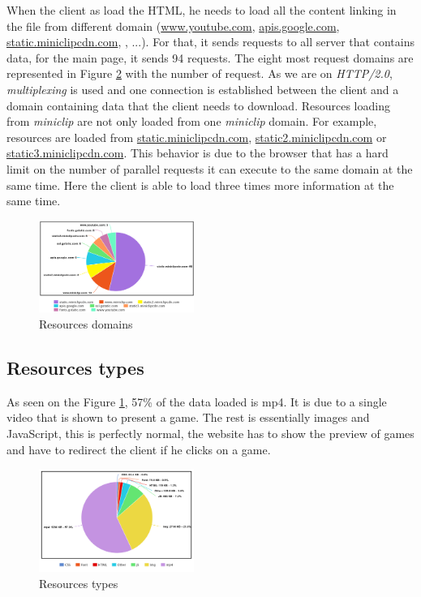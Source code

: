 \documentclass{article}
\begin{document}
When the client as load the HTML, he needs to load all the content linking in the file from different domain (\url{www.youtube.com}, \url{apis.google.com}, \url{static.miniclipcdn.com}, , ...). For that, it sends requests to all server that contains data, for the main page, it sends 94 requests. The eight most request domains are represented in Figure \ref{fig:res} with the number of request. As we are on \textit{HTTP/2.0}, \textit{multiplexing} is used and one connection is established between the client and a domain containing data that the client needs to download.
Resources loading from \textit{miniclip} are not only loaded from one \textit{miniclip} domain. For example, resources are loaded from \url{static.miniclipcdn.com}, \url{static2.miniclipcdn.com} or \url{static3.miniclipcdn.com}. This behavior is due to the browser that has a hard limit on the number of parallel requests it can execute to the same domain at the same time. Here the client is able to load three times more information at the same time.

\begin{figure}[h!]
    \centering
    \includegraphics[width=0.45\textwidth]{res/imgs/domains.png}
    \caption{Resources domains}
    \label{fig:resdom}
\end{figure}

\subsection{Resources types}
\label{sub:res}

As seen on the Figure \ref{fig:resdom}, 57\% of the data loaded is mp4. It is due to a single video that is shown to present a game. The rest is essentially images and JavaScript, this is perfectly normal, the website has to show the preview of games and have to redirect the client if he clicks on a game.

\begin{figure}[h!]
    \centering
    \includegraphics[width=0.45\textwidth]{res/imgs/resources.png}
    \caption{Resources types}
    \label{fig:res}
\end{figure}
\end{document}
